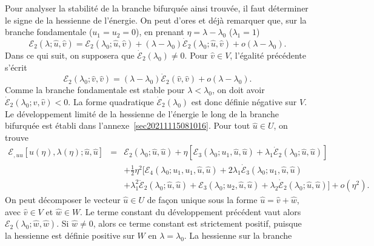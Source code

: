 \documentclass[12pt, final]{amsart}
\begin{document}
Pour analyser la stabilité de la branche bifurquée ainsi trouvée,
il faut déterminer le signe de la hessienne de l'énergie. On peut
d'ores et déjà remarquer que, sur la branche fondamentale ($u_1 = u_2
= 0$), en prenant $\eta = \lambda - \lambda_0$ ($\lambda_1 = 1$)
\begin{equation}
  \mathcal{E}_2 (\lambda ; \hat{u}, \hat{v}) =\mathcal{E}_2 (\lambda_0 ;
  \hat{u}, \hat{v}) + (\lambda - \lambda_0)  \dot{\mathcal{E}}_2 (\lambda_0 ;
  \hat{u}, \hat{v}) + o (\lambda - \lambda_0) .
\end{equation}
Dans ce qui suit, on supposera que $\dot{\mathcal{E}}_2 (\lambda_0) \neq 0$.
Pour $\hat{v} \in V$, l'égalité précédente s'écrit
\begin{equation}
  \mathcal{E}_2 (\lambda_0 ; \hat{v}, \hat{v}) = (\lambda - \lambda_0)
  \dot{\mathcal{E}}_2 (\hat{v}, \hat{v}) + o (\lambda - \lambda_0) .
\end{equation}
Comme la branche fondamentale est stable pour $\lambda < \lambda_0$, on doit
avoir $\dot{\mathcal{E}}_2 (\lambda_0 ; \hat{v}, \hat{v}) < 0$. La forme
quadratique $\dot{\mathcal{E}}_2 (\lambda_0)$ est donc définie
négative sur $V$. Le développement limité de la hessienne de
l'énergie le long de la branche bifurquée est établi dans
l'annexe~\ref{sec20211115081016}. Pour tout $\hat{u} \in U$, on trouve
\begin{eqnarray}
  \mathcal{E}_{, u  u} [u (\eta), \lambda (\eta) ; \hat{u}, \hat{u}] &
  = & \mathcal{E}_2 (\lambda_0 ; \hat{u}, \hat{u}) + \eta [\mathcal{E}_3
  (\lambda_0 ; u_1, \hat{u}, \hat{u}) + \lambda_1  \dot{\mathcal{E}}_2
  (\lambda_0 ; \hat{u}, \hat{u})] \nonumber\\
  &  & + \tfrac{1}{2} \eta^2  [\mathcal{E}_4 (\lambda_0 ; u_1, u_1, \hat{u},
  \hat{u}) + 2 \lambda_1  \dot{\mathcal{E}}_3 (\lambda_0 ; u_1, \hat{u},
  \hat{u})  \nonumber\\
  &  & + \lambda_1^2  \ddot{\mathcal{E}}_2 (\lambda_0 ; \hat{u}, \hat{u})
  +\mathcal{E}_3 (\lambda_0 ; u_2, \hat{u}, \hat{u})  + \lambda_2
  \dot{\mathcal{E}}_2 (\lambda_0 ; \hat{u}, \hat{u})] + o (\eta^2) .
  \label{eq20211115082025}
\end{eqnarray}
On peut décomposer le vecteur $\hat{u} \in U$ de fa{\c c}on unique sous la
forme $\hat{u} = \hat{v} + \hat{w}$, avec $\hat{v} \in V$ et $\hat{w} \in W$.
Le terme constant du développement précédent vaut alors
$\mathcal{E}_2 (\lambda_0 ; \hat{w}, \hat{w})$. Si $\hat{w} \neq 0$, alors ce
terme constant est strictement positif, puisque la hessienne est définie
positive sur $W$ en $\lambda = \lambda_0$. La hessienne sur la branche
\end{document}
